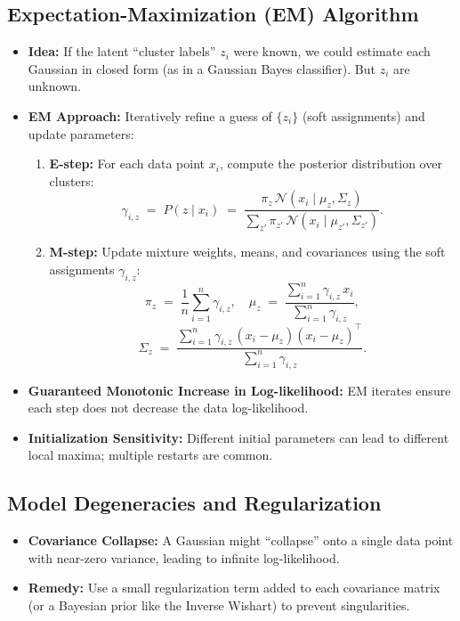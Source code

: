 \documentclass[twocolumn]{article}
\begin{document}
\begin{spacing}{1}
\subsection{Expectation-Maximization (EM) Algorithm}
\begin{itemize}
    \item \textbf{Idea:} If the latent “cluster labels” $z_i$ were known, we could estimate each Gaussian in closed form (as in a Gaussian Bayes classifier). But $z_i$ are unknown.
    \item \textbf{EM Approach:} Iteratively refine a guess of $\{z_i\}$ (soft assignments) and update parameters:
    \begin{enumerate}
        \item \textbf{E-step:} For each data point $x_i$, compute the posterior distribution over clusters:
        \[
            \gamma_{i,z} \;=\; P(z \mid x_i) 
            \;=\; \frac{\pi_z\,\mathcal{N}(x_i \mid \mu_z,\Sigma_z)}{\sum_{z'} \pi_{z'}\,\mathcal{N}(x_i \mid \mu_{z'},\Sigma_{z'})}.
        \]
        \item \textbf{M-step:} Update mixture weights, means, and covariances using the soft assignments $\gamma_{i,z}$:
        \[
            \pi_z 
            \;=\; 
            \frac{1}{n}\sum_{i=1}^n \gamma_{i,z},
            \quad
            \mu_z 
            \;=\;
            \frac{\sum_{i=1}^n \gamma_{i,z} \, x_i}{\sum_{i=1}^n \gamma_{i,z}},
        \]
        \[
            \Sigma_z
            \;=\;
            \frac{\sum_{i=1}^n \gamma_{i,z} \, (x_i - \mu_z)(x_i - \mu_z)^\top}{\sum_{i=1}^n \gamma_{i,z}}.
        \]
    \end{enumerate}
    \item \textbf{Guaranteed Monotonic Increase in Log-likelihood:} EM iterates ensure each step does not decrease the data log-likelihood.
    \item \textbf{Initialization Sensitivity:} Different initial parameters can lead to different local maxima; multiple restarts are common.
\end{itemize}

\subsection{Model Degeneracies and Regularization}
\begin{itemize}
    \item \textbf{Covariance Collapse:} A Gaussian might “collapse” onto a single data point with near-zero variance, leading to infinite log-likelihood.
    \item \textbf{Remedy:} Use a small regularization term added to each covariance matrix (or a Bayesian prior like the Inverse Wishart) to prevent singularities.
\end{itemize}


\end{spacing}
\end{document}

